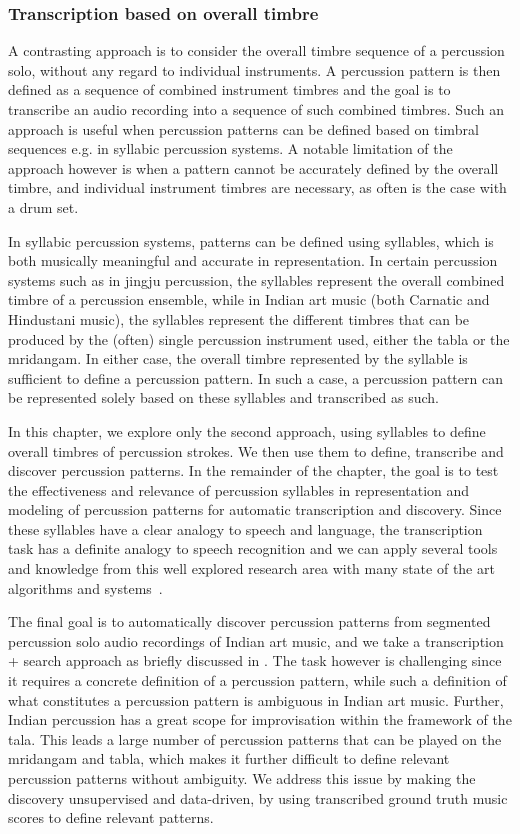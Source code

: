 \subsubsection{Transcription based on overall timbre}
A contrasting approach is to consider the overall timbre sequence of a percussion solo, without any regard to individual instruments. A percussion pattern is then defined as a sequence of combined instrument timbres and the goal is to transcribe an audio recording into a sequence of such combined timbres. Such an approach is useful when percussion patterns can be defined based on timbral sequences e.g. in syllabic percussion systems. A notable limitation of the approach however is when a pattern cannot be accurately defined by the overall timbre, and individual instrument timbres are necessary, as often is the case with a drum set. 

In syllabic percussion systems, patterns can be defined using syllables, which is both musically meaningful and accurate in representation. In certain percussion systems such as in \gls{jingju} percussion, the syllables represent the overall combined timbre of a percussion ensemble, while in Indian art music (both Carnatic and Hindustani music), the syllables represent the different timbres that can be produced by the (often) single percussion instrument used, either the \gls{tabla} or the mridangam. In either case, the overall timbre represented by the syllable is sufficient to define a percussion pattern. In such a case, a percussion pattern can be represented solely based on these syllables and transcribed as such. 

In this chapter, we explore only the second approach, using syllables to define overall timbres of percussion strokes. We then use them to define, transcribe and discover percussion patterns. In the remainder of the chapter, the goal is to test the effectiveness and relevance of percussion syllables in representation and modeling of percussion patterns for automatic transcription and discovery. Since these syllables have a clear analogy to speech and language, the transcription task has a definite analogy to speech recognition and we can apply several tools and knowledge from this well explored research area with many state of the art algorithms and systems~\cite{huang:10:sroverview}. 

The final goal is to automatically discover percussion patterns from segmented percussion solo audio recordings of Indian art music, and we take a transcription + search approach as briefly discussed in . The task however is challenging since it requires a concrete definition of a percussion pattern, while such a definition of what constitutes a percussion pattern is ambiguous in Indian art music. Further, Indian percussion has a great scope for improvisation within the framework of the \gls{tala}. This leads a large number of percussion patterns that can be played on the mridangam and tabla, which makes it further difficult to define relevant percussion patterns without ambiguity. We address this issue by making the discovery unsupervised and data-driven, by using transcribed ground truth music scores to define relevant patterns. 

